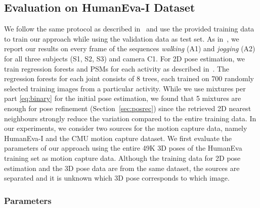 \documentclass[10pt,twocolumn,letterpaper]{article}
\begin{document}
\vspace{-1mm}
\subsection{Evaluation on HumanEva-I Dataset}
We follow the same protocol as described in~\cite{SimoSerraCVPR2013,Ilya_2014} and use the provided training data to train our approach while using the validation data as test set. As in~\cite{SimoSerraCVPR2013,Ilya_2014}, we report our results on every  frame of the sequences \textit{walking} (A1) and \textit{jogging} (A2) for all three subjects (S1, S2, S3) and camera C1. For 2D pose estimation, we train regression forests and PSMs for each activity as described in~\cite{dantone_tpami2014}. The regression forests for each joint consists of 8 trees, each trained on 700 randomly selected training images from a particular activity. While we use  mixtures per part \eqref{eq:binary} for the initial pose estimation, we found that 5 mixtures are enough for pose refinement (Section~\ref{sec:posrec}) since the retrieved 2D nearest neighbours strongly reduce the variation compared to the entire training data. In our experiments, we consider two sources for the motion capture data, namely HumanEva-I and the CMU motion capture dataset. We first evaluate the parameters of our approach using the entire 49K 3D poses of the HumanEva training set as motion capture data. Although the training data for 2D pose estimation and the 3D pose data are from the same dataset, the sources are separated and it is unknown which 3D pose corresponds to which image.

\vspace{-2.5mm}
\subsubsection{Parameters}\label{sec:par}
\end{document}

